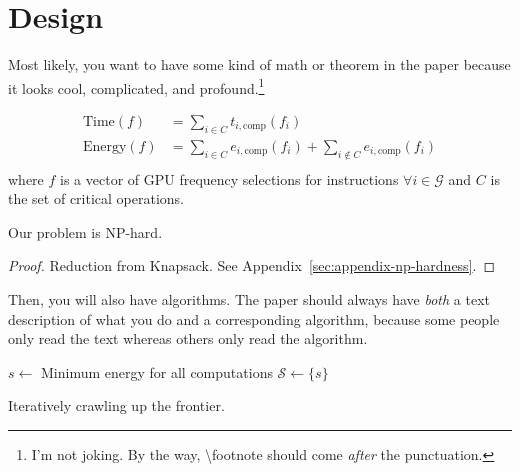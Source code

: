 \section{Design}\label{sec:design}

Most likely, you want to have some kind of math or theorem in the paper because it looks cool, complicated, and profound.\footnote{I'm not joking. By the way, \textbackslash{}footnote should come \emph{after} the punctuation.}

\begin{equation}
  \label{eq:design-optimization}
  \begin{aligned}
    \textrm{Time}(f)   & = \sum_{i \in C}{t_{i,\textrm{comp}}(f_i)} \\
    \textrm{Energy}(f) & = \sum_{i \in C}{e_{i,\textrm{comp}}(f_i)} + \sum_{i \notin C}{e_{i,\textrm{comp}}(f_i)} \\
  \end{aligned}
\end{equation}
where $f$ is a vector of GPU frequency selections for instructions $\forall i \in \mathcal{G}$ and $C$ is the set of critical operations.

\begin{theorem}
  Our problem is NP-hard.
\end{theorem}
\begin{proof}
  Reduction from Knapsack. See Appendix~\ref{sec:appendix-np-hardness}.
\end{proof}

Then, you will also have algorithms.
The paper should always have \emph{both} a text description of what you do and a corresponding algorithm, because some people only read the text whereas others only read the algorithm.

\begin{algorithm}[t]
  \algrule{}


  \algrule{}

  $s \leftarrow$ Minimum energy for all computations\;\label{algoline:design-min-energy-plan}
  $\mathcal{S} \leftarrow \{ s \}$\;



  \algrule{}

  \caption{Iteratively crawling up the frontier.}\label{algo:design-overview}
\end{algorithm}
